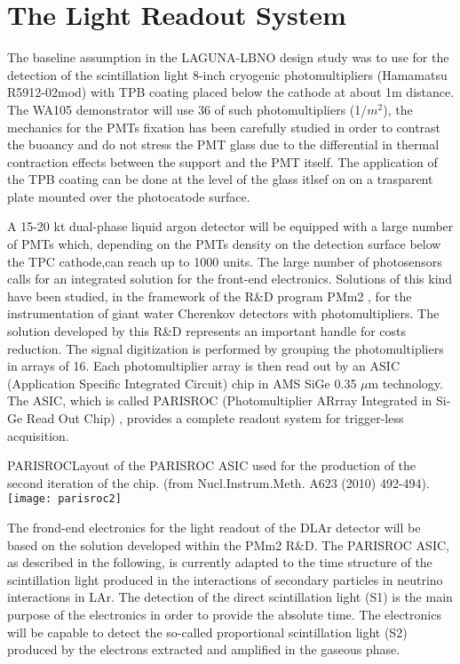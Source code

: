 \section{The Light Readout System} 
\label{sec:detectors-fd-alt-light}

The baseline assumption in the LAGUNA-LBNO design study was to use for the detection of the scintillation light 8-inch cryogenic photomultipliers (Hamamatsu R5912-02mod) with TPB coating placed below the cathode at about 1m distance. The WA105 demonstrator will use 36 of such photomultipliers (1/$m^2$), the mechanics for the PMTs fixation has been carefully studied in order to contrast the buoancy and do not stress the PMT glass due to the differential in thermal contraction effects between the support and the PMT itself. The application of the TPB coating can be done at the level of the glass itlsef on on a trasparent plate mounted over the photocatode surface.

A 15-20 kt dual-phase liquid argon detector will be equipped with a large number of PMTs which, depending on the PMTs density on the detection surface below the TPC cathode,can reach up to 1000 units. The large number of photosensors calls for an integrated solution for the front-end electronics.
Solutions of this kind have been studied, in the framework of the R\&D program PMm2 \cite{PMM2-1, PMM2-2}, for the instrumentation of giant water
Cherenkov detectors with photomultipliers. The solution developed by this R\&D represents an
important handle for costs reduction. The signal digitization is performed by grouping the
photomultipliers in arrays of 16. Each photomultiplier array is then read out by an ASIC
(Application Specific Integrated Circuit) chip in AMS SiGe 0.35 $\mu$m technology. The ASIC,
which is called PARISROC (Photomultiplier ARrray Integrated in Si-Ge Read Out Chip) 
\cite{Parisroc}, provides a complete readout system for trigger-less acquisition.

\begin{cdrfigure}{PARISROC}{Layout of the PARISROC ASIC used for the production of the second iteration of the
chip. (from Nucl.Instrum.Meth. A623 (2010) 492-494).}
 \texttt{[image: parisroc2]}  
\end{cdrfigure}

The frond-end electronics for the light readout of the DLAr detector will be based on the solution 
developed within the PMm2 R\&D. The PARISROC ASIC, as described in the following, is currently adapted to the 
time structure of the scintillation light produced in the interactions of secondary particles in neutrino interactions in LAr. 
The detection of the direct scintillation light (S1) is the main purpose of the electronics in order to provide the absolute time.
The electronics will be capable to detect the so-called proportional scintillation light (S2) produced by the electrons extracted and amplified in the gaseous phase.

